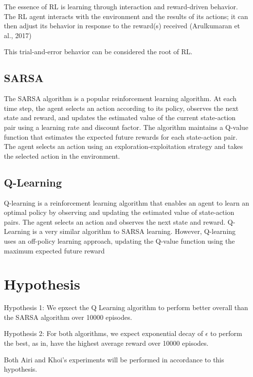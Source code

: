\documentclass[nohyperref]{article}
\theoremstyle{plain}
\theoremstyle{definition}
\theoremstyle{remark}
\begin{document}
The essence of RL is learning through interaction and reward-driven behavior. The RL agent interacts with the environment and the results of its actions; it can then adjust its behavior in
response to the reward(s) received (Arulkumaran et al., 2017)

This trial-and-error behavior can be considered the root of RL.

\subsection{SARSA}
The SARSA algorithm is a popular reinforcement learning algorithm. At each time step, the agent selects an action according to its policy, observes the next state and reward, and updates the estimated value of the current state-action pair using a learning rate and discount factor. 
The algorithm maintains a Q-value function that estimates the expected future rewards for each state-action pair. The agent selects an action using an exploration-exploitation strategy and takes the selected action in the environment.

\subsection{Q-Learning}
Q-learning is a reinforcement learning algorithm that enables an agent to learn an optimal policy by observing and updating the estimated value of state-action pairs. 
The agent selects an action and observes the next state and reward.
Q-Learning is a very similar algorithm to SARSA learning. However, Q-learning uses an off-policy learning approach, updating the Q-value function using the maximum expected future reward

\section{Hypothesis}

Hypothesis 1: We epxect the Q Learning algorithm to perform better overall than the SARSA algorithm over 10000 episodes.

Hypothesis 2: For both algorithms, we expect exponential decay of $\epsilon$ to perform the best, as in, have the highest average reward over 10000 episodes.

Both Airi and Khoi's experiments will be performed in accordance to this hypothesis.
\end{document}
